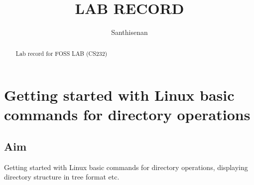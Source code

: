 \documentclass{article}
\begin{document}
\title{LAB RECORD}
\author{Santhisenan}
\maketitle

\begin{abstract}
Lab record for FOSS LAB (CS232)
\end{abstract}

\newpage

\section{Getting started with Linux basic commands for directory operations}

\subsection{Aim}
Getting started with Linux basic commands for directory operations, displaying directory structure in tree format etc.
\end{document}
